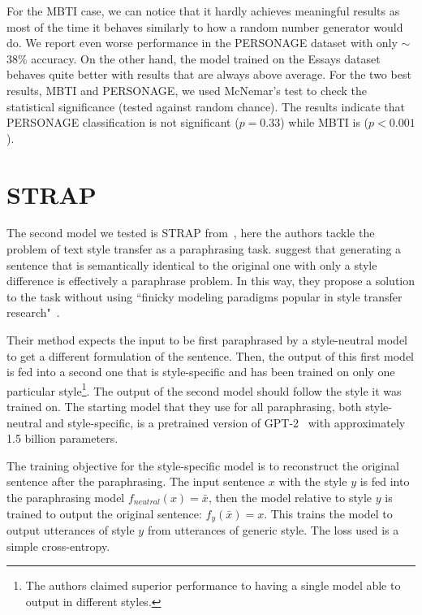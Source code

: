 \documentclass[nomenclature, english, biblatex]{kththesis}
\begin{document}
For the MBTI case, we can notice that it hardly achieves meaningful results as most of the time it behaves similarly to how a random number generator would do. We report even worse performance in the PERSONAGE dataset with only $\sim$38\% accuracy. %
On the other hand, the model trained on the Essays dataset behaves quite better with results that are always above average. For the two best results, MBTI and PERSONAGE, we used McNemar’s test to check the statistical significance (tested against random chance). The results indicate that PERSONAGE classification is not significant ($p=0.33$) while MBTI is ($p<0.001$).
\section{STRAP}
\label{sec:strap}
The second model we tested is \gls{STRAP} from~\cite{krishna2020reformulating}, here the authors tackle the problem of text style transfer as a paraphrasing task. \textcite{krishna2020reformulating} suggest that generating a sentence that is semantically identical to the original one with only a style difference is effectively a paraphrase problem. In this way, they propose a solution to the task without using ``finicky modeling paradigms popular in style transfer research"~\cite{krishna2020reformulating}.

Their method expects the input to be first paraphrased by a style-neutral model to get a different formulation of the sentence. Then, the output of this first model is fed into a second one that is style-specific and has been trained on only one particular style\footnote{The authors claimed superior performance to having a single model able to output in different styles.}. The output of the second model should follow the style it was trained on. The starting model that they use for all paraphrasing, both style-neutral and style-specific, is a pretrained version of GPT-2~\cite{radford2019language} with approximately 1.5 billion parameters. 

The training objective for the style-specific model is to reconstruct the original sentence after the paraphrasing. The input sentence $x$ with the style $y$ is fed into the paraphrasing model $f_{neutral}(x) = \bar{x}$, then the model relative to style $y$ is trained to output the original sentence: $f_y(\bar{x}) = x$. This trains the model to output utterances of style $y$ from utterances of generic style. The loss used is a simple cross-entropy.
\end{document}
